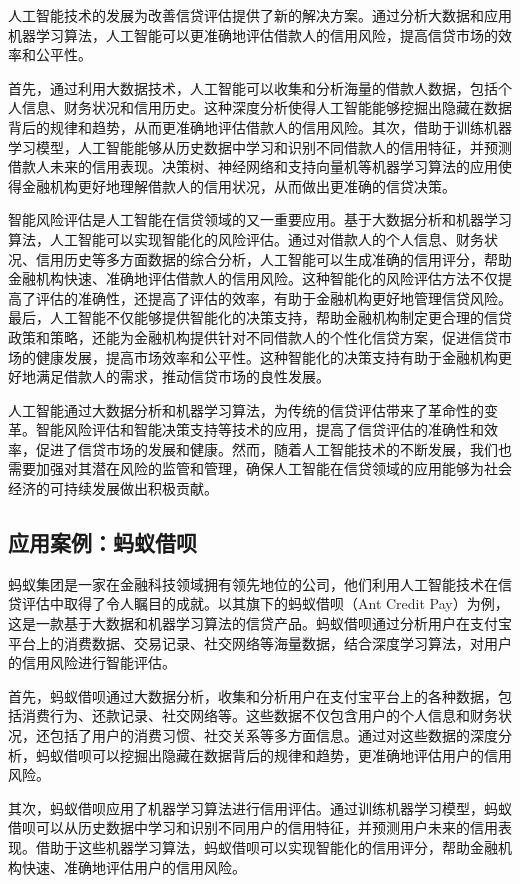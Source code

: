人工智能技术的发展为改善信贷评估提供了新的解决方案。通过分析大数据和应用机器学习算法，人工智能可以更准确地评估借款人的信用风险，提高信贷市场的效率和公平性。

首先，通过利用大数据技术，人工智能可以收集和分析海量的借款人数据，包括个人信息、财务状况和信用历史。这种深度分析使得人工智能能够挖掘出隐藏在数据背后的规律和趋势，从而更准确地评估借款人的信用风险。其次，借助于训练机器学习模型，人工智能能够从历史数据中学习和识别不同借款人的信用特征，并预测借款人未来的信用表现。决策树、神经网络和支持向量机等机器学习算法的应用使得金融机构更好地理解借款人的信用状况，从而做出更准确的信贷决策。

智能风险评估是人工智能在信贷领域的又一重要应用。基于大数据分析和机器学习算法，人工智能可以实现智能化的风险评估。通过对借款人的个人信息、财务状况、信用历史等多方面数据的综合分析，人工智能可以生成准确的信用评分，帮助金融机构快速、准确地评估借款人的信用风险。这种智能化的风险评估方法不仅提高了评估的准确性，还提高了评估的效率，有助于金融机构更好地管理信贷风险。最后，人工智能不仅能够提供智能化的决策支持，帮助金融机构制定更合理的信贷政策和策略，还能为金融机构提供针对不同借款人的个性化信贷方案，促进信贷市场的健康发展，提高市场效率和公平性。这种智能化的决策支持有助于金融机构更好地满足借款人的需求，推动信贷市场的良性发展。

人工智能通过大数据分析和机器学习算法，为传统的信贷评估带来了革命性的变革。智能风险评估和智能决策支持等技术的应用，提高了信贷评估的准确性和效率，促进了信贷市场的发展和健康。然而，随着人工智能技术的不断发展，我们也需要加强对其潜在风险的监管和管理，确保人工智能在信贷领域的应用能够为社会经济的可持续发展做出积极贡献。

\subsection{应用案例：蚂蚁借呗}
蚂蚁集团是一家在金融科技领域拥有领先地位的公司，他们利用人工智能技术在信贷评估中取得了令人瞩目的成就。以其旗下的蚂蚁借呗（Ant Credit Pay）为例，这是一款基于大数据和机器学习算法的信贷产品。蚂蚁借呗通过分析用户在支付宝平台上的消费数据、交易记录、社交网络等海量数据，结合深度学习算法，对用户的信用风险进行智能评估。

首先，蚂蚁借呗通过大数据分析，收集和分析用户在支付宝平台上的各种数据，包括消费行为、还款记录、社交网络等。这些数据不仅包含用户的个人信息和财务状况，还包括了用户的消费习惯、社交关系等多方面信息。通过对这些数据的深度分析，蚂蚁借呗可以挖掘出隐藏在数据背后的规律和趋势，更准确地评估用户的信用风险。

其次，蚂蚁借呗应用了机器学习算法进行信用评估。通过训练机器学习模型，蚂蚁借呗可以从历史数据中学习和识别不同用户的信用特征，并预测用户未来的信用表现。借助于这些机器学习算法，蚂蚁借呗可以实现智能化的信用评分，帮助金融机构快速、准确地评估用户的信用风险。

